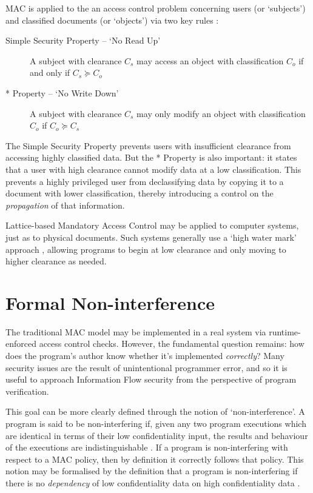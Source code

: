 MAC is applied to the an access control problem concerning users (or `subjects') and classified documents (or `objects') via two key rules \cite{sandhu1993lattice}:

\begin{description}
	\item[Simple Security Property -- `No Read Up'] A subject with clearance $ C_s $ may access an object with classification $ C_o $ if and only if $ C_s \succeq C_o $
	
	\item[* Property -- `No Write Down'] A subject with clearance $ C_s $ may only modify an object with classification $ C_o $ if $ C_o \succeq C_s $
\end{description}

The Simple Security Property prevents users with insufficient clearance from accessing highly classified data. But the * Property is also important: it states that a user with high clearance cannot modify data at a low classification. This prevents a highly privileged user from declassifying data by copying it to a document with lower classification, thereby introducing a control on the \textit{propagation} of that information.

Lattice-based Mandatory Access Control may be applied to computer systems, just as to physical documents. Such systems generally use a `high water mark' approach \cite{jones1975highwatermark}, allowing programs to begin at low clearance and only moving to higher clearance as needed.

\section{Formal Non-interference}

The traditional MAC model may be implemented in a real system via runtime-enforced access control checks. However, the fundamental question remains: how does the program's author know whether it's implemented \textit{correctly}? Many security issues are the result of unintentional programmer error, and so it is useful to approach Information Flow security from the perspective of program verification.

This goal can be more clearly defined through the notion of `non-interference'. A program is said to be non-interfering if, given any two program executions which are identical in terms of their low confidentiality input, the results and behaviour of the executions are indistinguishable \cite{sabelfeld2003if}. If a program is non-interfering with respect to a MAC policy, then by definition it correctly follows that policy. This notion may be formalised by the definition that a program is non-interfering if there is no \textit{dependency} of low confidentiality data on high confidentiality data \cite{cohen1977declassification}.

